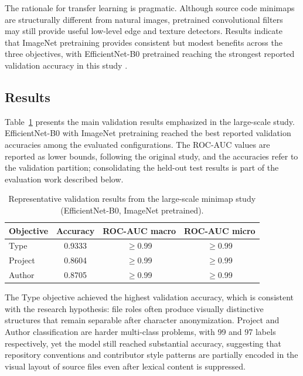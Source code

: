 The rationale for transfer learning is pragmatic. Although source code minimaps
are structurally different from natural images, pretrained convolutional filters
may still provide useful low-level edge and texture detectors. Results indicate
that ImageNet pretraining provides consistent but modest benefits across the
three objectives, with EfficientNet-B0 pretrained reaching the strongest
reported validation accuracy in this study \cite{gebara2025ciarp}.

\subsection{Results}

Table~\ref{tab:study2-results} presents the main validation results emphasized
in the large-scale study. EfficientNet-B0 with ImageNet pretraining reached the
best reported validation accuracies among the evaluated configurations. The
ROC-AUC values are reported as lower bounds, following the original study, and
the accuracies refer to the validation partition; consolidating the held-out
test results is part of the evaluation work described below.

\begin{table}[ht]
\centering
\caption{Representative validation results from the large-scale minimap study
(EfficientNet-B0, ImageNet pretrained).}
\label{tab:study2-results}
\begin{tabular}{p{}ccc}
\toprule
\textbf{Objective} & \textbf{Accuracy} & \textbf{ROC-AUC macro} & \textbf{ROC-AUC micro} \\
\midrule
Type    & 0.9333 & $\geq$0.99 & $\geq$0.99 \\
Project & 0.8604 & $\geq$0.99 & $\geq$0.99 \\
Author  & 0.8705 & $\geq$0.99 & $\geq$0.99 \\
\bottomrule
\end{tabular}
\fautor
\end{table}

The Type objective achieved the highest validation accuracy, which is
consistent with the research hypothesis: file roles often produce visually
distinctive structures that remain separable after character anonymization.
Project and Author classification are harder multi-class problems, with 99 and
97 labels respectively, yet the model still reached substantial accuracy,
suggesting that repository conventions and contributor style patterns are
partially encoded in the visual layout of source files even after lexical
content is suppressed.

